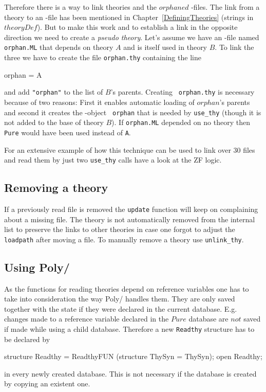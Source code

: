 Therefore there is a way to link theories and the $orphaned$ \ML-files. The
link from a theory to an \ML-file has been mentioned in
Chapter~\ref{DefiningTheories} (strings in $theoryDef$).  But to make this
work and to establish a link in the opposite direction we need to create a
{\it pseudo theory}.  Let's assume we have an \ML-file named {\tt orphan.ML}
that depends on theory $A$ and is itself used in theory $B$.  To link the
three we have to create the file {\tt orphan.thy} containing the line
\begin{ttbox}
orphan = A
\end{ttbox}
and add {\tt "orphan"} to the list of $B$'s parents.  Creating {\tt
  orphan.thy} is necessary because of two reasons: First it enables automatic
loading of $orphan$'s parents and second it creates the \ML{}-object {\tt
  orphan} that is needed by {\tt use_thy} (though it is not added to the base
of theory $B$).  If {\tt orphan.ML} depended on no theory then {\tt Pure}
would have been used instead of {\tt A}.

For an extensive example of how this technique can be used to link over 30
files and read them by just two {\tt use_thy} calls have a look at the ZF
logic.


\subsection{Removing a theory}

If a previously read file is removed the {\tt update} function will keep
on complaining about a missing file.  The theory is not automatically removed
from the internal list to preserve the links to other theories in case one
forgot to adjust the {\tt loadpath} after moving a file.  To manually remove a
theory use {\tt unlink_thy}.


\subsection{Using Poly/\ML}

As the functions for reading theories depend on reference variables one has to
take into consideration the way Poly/\ML{} handles them.  They are only saved
together with the state if they were declared in the current database.  E.g.
changes made to a reference variable declared in the $Pure$ database are $not$
saved if made while using a child database.  Therefore a new {\tt Readthy}
structure has to be declared by
\begin{ttbox}
structure Readthy = ReadthyFUN (structure ThySyn = ThySyn);
open Readthy;
\end{ttbox}
in every newly created database.  This is not necessary if the database is
created by copying an existent one.

